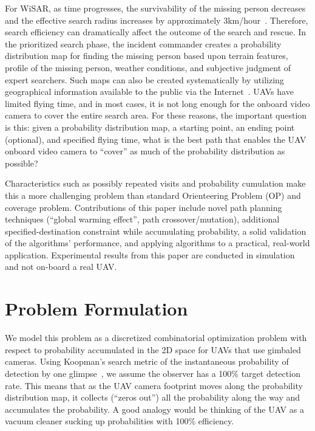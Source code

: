 \documentclass[letterpaper, 10 pt, conference]{ieeeconf}
\begin{document}
For WiSAR, as time progresses, the survivability of the missing person decreases and the effective search radius increases by approximately 3km/hour~\cite{[01UAVSpecific]SetnickaWiSAR,[01UAVSpecific]SyrotuckIntroToLandSearch}. Therefore, search efficiency can dramatically affect the outcome of the search and rescue. In the prioritized search phase, the incident commander creates a probability distribution map for finding the missing person based upon terrain features, profile of the missing person, weather conditions, and subjective judgment of expert searchers. Such maps can also be created systematically by utilizing geographical information available to the public via the Internet~\cite{LannyBRIMS09Paper,GISSAR,UtilityGISSAR}. UAVs have limited flying time, and in most cases, it is not long enough for the onboard video camera to cover the entire search area. For these reasons, the important question is this: given a probability distribution map, a starting point, an ending point (optional), and specified flying time, what is the best path that enables the UAV onboard video camera to ``cover'' as much of the probability distribution as possible?

Characteristics such as possibly repeated visits and probability cumulation make this a more challenging problem than standard Orienteering Problem (OP) and coverage problem. Contributions of this paper include novel path planning techniques (``global warming effect'', path crossover/mutation), additional specified-destination constraint while accumulating probability, a solid validation of the algorithms' performance, and applying algorithms to a practical, real-world application. Experimental results from this paper are conducted in simulation and not on-board a real UAV. 

\section{Problem Formulation}

We model this problem as a discretized combinatorial optimization problem with respect to probability accumulated in the 2D space for UAVs that use gimbaled cameras. Using Koopman's search metric of the instantaneous probability of detection by one glimpse~\cite{[02GeneralStuff]Koopman80}, we assume the observer has a 100\% target detection rate. This means that as the UAV camera footprint moves along the probability distribution map, it collects (``zeros out'') all the probability along the way and accumulates the probability. A good analogy would be thinking of the UAV as a vacuum cleaner sucking up probabilities with 100\% efficiency.
\end{document}
